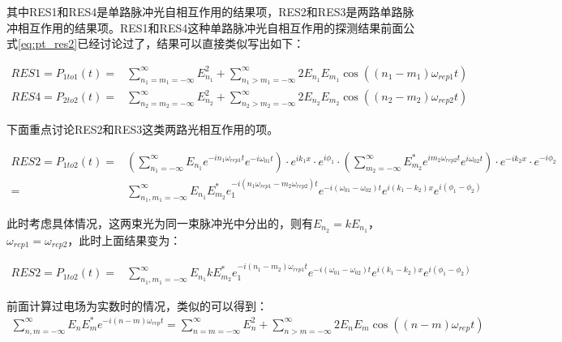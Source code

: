 其中RES1和RES4是单路脉冲光自相互作用的结果项，RES2和RES3是两路单路脉冲相互作用的结果项。RES1和RES4这种单路脉冲光自相互作用的探测结果前面公式\eqref{eq:pt_res2}已经讨论过了，结果可以直接类似写出如下：

\begin{align}
    RES1=P_{1to1}(t)=&\sum_{n_1=m_1=-\infty}^{\infty}E_{n_1}^2 + \sum_{n_1>m_1=-\infty}^{\infty}2E_{n_1} E_{m_1} \cos\left((n_1-m_1)\omega_{rep1}t\right)\label{eq:final_res1}\\
    RES4=P_{2to2}(t)=&\sum_{n_2=m_2=-\infty}^{\infty}E_{n_2}^2 + \sum_{n_2>m_2=-\infty}^{\infty}2E_{n_2} E_{m_2} \cos\left((n_2-m_2)\omega_{rep2}t\right)\label{eq:final_res4}
\end{align}


下面重点讨论RES2和RES3这类两路光相互作用的项。
\begin{footnotesize}
\begin{align}
    RES2=P_{1to2}(t)=&\left(\sum_{n_1=-\infty}^{\infty}E_{n_1}e^{-in_1\omega_{rep1}t}e^{-i\omega_{01}t}\right)\cdot e^{ik_1x}\cdot e^{i\phi_1} 
    \cdot \left(\sum_{m_2=-\infty}^{\infty}E_{m_2}^*e^{im_2\omega_{rep2}t}e^{i\omega_{02}t}\right)\cdot e^{-ik_2x}\cdot e^{-i\phi_2}\\
    =&\sum_{n_1,m_1=-\infty}^{\infty}E_{n_1}E_{m_2}^*e_1^{-i(n_1\omega_{rep1}-m_2\omega_{rep2})t}e^{-i(\omega_{01}-\omega_{02})t}e^{i(k_1-k_2)x}e^{i(\phi_1-\phi_2)}
\end{align}
\end{footnotesize}

此时考虑具体情况，这两束光为同一束脉冲光中分出的，则有$E_{n_2}=kE_{n_1}$，$\omega_{rep1}=\omega_{rep2}$，此时上面结果变为：
\begin{footnotesize}
\begin{align}
    RES2=P_{1to2}(t)=&\sum_{n_1,m_1=-\infty}^{\infty}E_{n_1}kE_{m_2}^*e_1^{-i(n_1-m_2)\omega_{rep1}t}e^{-i(\omega_{01}-\omega_{02})t}e^{i(k_1-k_2)x}e^{i(\phi_1-\phi_2)}
\end{align}
\end{footnotesize}

前面计算过电场为实数时的情况，类似的可以得到：
\begin{align}
    \sum_{n,m=-\infty}^{\infty}E_nE_m^*e^{-i(n-m)\omega_{rep}t}=\sum_{n=m=-\infty}^{\infty}E_n^2+\sum_{n>m=-\infty}^{\infty}2E_nE_m\cos((n-m)\omega_{rep}t)
\end{align}

